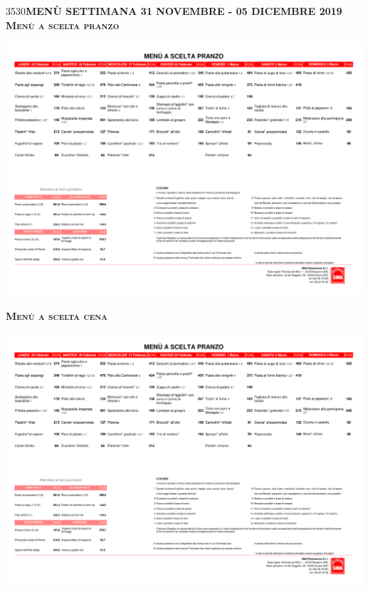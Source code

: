 \documentclass{article}
\makeatletter
\newcommand\HUGE{\@setfontsize\Huge{35}{30}}
\newcommand{\fraseuno}{MENÙ SETTIMANA 31 NOVEMBRE - 05 DICEMBRE 2019}
\makeatother
\begin{document}
%
\begin{center}
{\HUGE \color{red}\textbf{\fraseuno}}\\
\vspace{0.7cm}
{\Huge \textbf{\textsc{Menù a scelta pranzo}}}\\
\end{center}
\includegraphics[trim=0cm 16cm 0cm 2cm,clip,page=1,width=\textwidth,]{scelta.pdf}
\vspace{0.3cm}
\begin{center}
{\Huge \textbf{\textsc{Menù a scelta cena}}}\\
\end{center}
\includegraphics[trim=0cm 17cm 0cm 2cm,clip,page=2,width=\textwidth,]{scelta.pdf}
\end{document}
